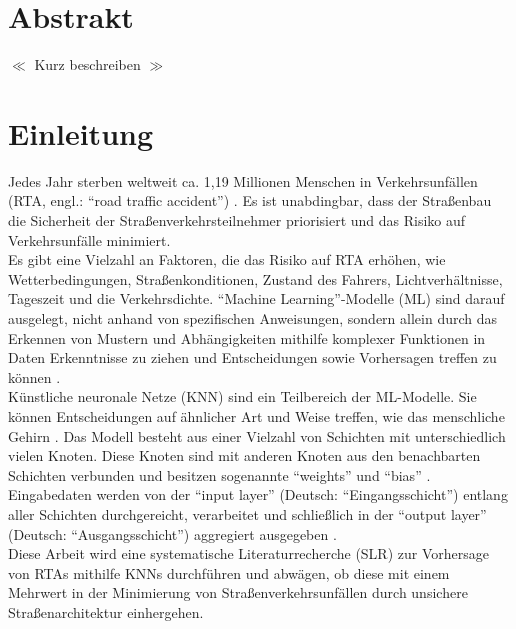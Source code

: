 \documentclass{scrartcl}
\begin{document}

\newpage
\onehalfspacing

\section*{Abstrakt}
$\ll$ Kurz beschreiben $\gg$

\newpage
\tableofcontents
\newpage

\section{Einleitung}

Jedes Jahr sterben weltweit ca. 1,19 Millionen Menschen in Verkehrsunfällen
(RTA, engl.: \enquote{road traffic accident}) \cite{who}.
Es ist unabdingbar, dass der Straßenbau die Sicherheit der Straßenverkehrsteilnehmer
priorisiert und das Risiko auf Verkehrsunfälle minimiert.
\medskip \\
Es gibt eine Vielzahl an Faktoren, die das Risiko auf RTA erhöhen, wie
Wetterbedingungen, Straßenkonditionen, Zustand des Fahrers, Lichtverhältnisse,
Tageszeit und die Verkehrsdichte. \enquote{Machine Learning}-Modelle (ML) sind darauf
ausgelegt, nicht anhand von spezifischen Anweisungen, sondern allein durch das Erkennen
von Mustern und Abhängigkeiten mithilfe komplexer Funktionen \cite{predict}
in Daten Erkenntnisse zu ziehen und Entscheidungen sowie Vorhersagen treffen
zu können \cite{sap}.
\medskip \\
Künstliche neuronale Netze (KNN) sind ein Teilbereich der ML-Modelle. Sie können
Entscheidungen auf ähnlicher Art und Weise treffen, wie das menschliche Gehirn \cite{ibm}.
Das Modell besteht aus einer Vielzahl von Schichten mit unterschiedlich vielen
Knoten. Diese Knoten sind mit anderen Knoten aus den benachbarten Schichten verbunden
und besitzen sogenannte \enquote{weights} und \enquote{bias} \cite{ibm}.
Eingabedaten werden von der \enquote{input layer} (Deutsch: \enquote{Eingangsschicht})
entlang aller Schichten durchgereicht, verarbeitet und schließlich in der
\enquote{output layer} (Deutsch: \enquote{Ausgangsschicht}) aggregiert ausgegeben \cite{ibm}.
\medskip \\
Diese Arbeit wird eine systematische Literaturrecherche (SLR) zur Vorhersage von RTAs
mithilfe KNNs durchführen und abwägen, ob diese mit einem Mehrwert in der Minimierung
von Straßenverkehrsunfällen durch unsichere Straßenarchitektur einhergehen.
\end{document}
